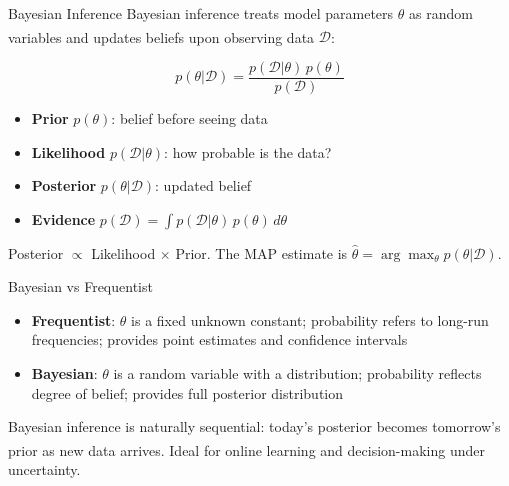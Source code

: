 \begin{v3topic}{Bayesian Inference}
    Bayesian inference treats model parameters $\theta$ as random variables
    and updates beliefs upon observing data
    $\mathcal{D}$:\textsuperscript{\cite[][pp.~14--19]{barberBayesianReasoningMachine2012}}

    \begin{equation}
        p(\theta|\mathcal{D}) = \frac{p(\mathcal{D}|\theta)\,p(\theta)}{p(\mathcal{D})}
    \end{equation}

    \begin{itemize}
        \item \textbf{Prior} $p(\theta)$: belief before seeing data
        \item \textbf{Likelihood} $p(\mathcal{D}|\theta)$: how probable is the data?
        \item \textbf{Posterior} $p(\theta|\mathcal{D})$: updated belief
        \item \textbf{Evidence} $p(\mathcal{D}) = \int p(\mathcal{D}|\theta)\,p(\theta)\,d\theta$
    \end{itemize}

    Posterior $\propto$ Likelihood $\times$ Prior.
    The MAP estimate is $\hat{\theta} = \arg\max_\theta p(\theta|\mathcal{D})$.

\end{v3topic}
\begin{v3topic}{Bayesian vs Frequentist}
    \begin{itemize}
        \item \textbf{Frequentist}: $\theta$ is a fixed unknown constant;
              probability refers to long-run frequencies; provides point
              estimates and confidence intervals
        \item \textbf{Bayesian}: $\theta$ is a random variable with a
              distribution; probability reflects degree of belief; provides
              full posterior distribution
    \end{itemize}

    Bayesian inference is naturally sequential: today’s posterior becomes
    tomorrow’s prior as new data
    arrives.\textsuperscript{\cite[][Ch.~1]{downeyThinkBayes2016}}
    Ideal for online learning and decision-making under uncertainty.

\end{v3topic}
